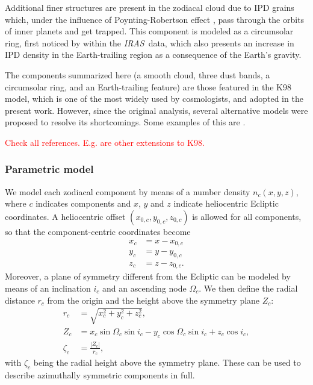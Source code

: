 \documentclass{aa}
\def\IRAS{\textit{{IRAS}}}
\newcommand{\angela}[0]{\textcolor{red}}
\begin{document}
Additional finer structures are present in the zodiacal cloud due to 
IPD grains which, under the influence of Poynting-Robertson effect \citep{Poynting1903,Robertson1937}, 
pass through the orbits of inner planets and get trapped. This component is modeled 
as a circumsolar ring, first noticed by \citet{Dermott1994} within the \IRAS\ data, 
which also presents an increase in IPD density in the Earth-trailing region as a consequence 
of the Earth's gravity.

The components summarized here (a smooth cloud, three dust bands, a circumsolar ring, and 
an Earth-trailing feature) are those featured in the K98 model, which is one of the most 
widely used by cosmologists, and adopted in the present work. However, since 
the original analysis, several alternative models were proposed to resolve its shortcomings. 
Some examples of this are \citet{sano, Korngut, skysurf, newhorizons, parker}.

\angela{Check all references. E.g. \citet{kennedy, jones_venus, Stenborg} are other 
extensions to K98.}

\subsubsection{Parametric model}
\label{sect:parametric_mod}

We model each zodiacal component by means of a number density $n_c(x,y,z)$, where $c$
indicates components and $x$, $y$ and $z$ indicate heliocentric Ecliptic coordinates. 
A heliocentric offset $(x_{0,c}, y_{0,c}, z_{0,c})$ is allowed for all components, 
so that the component-centric coordinates become
\begin{equation}    
    \begin{aligned}
        x_c&= x - x_{0,c}\\
        y_c&= y - y_{0,c}\\
        z_c&= z - z_{0,c}.
    \end{aligned}
\end{equation}
Moreover, a plane of symmetry different from the Ecliptic can be modeled by means 
of an inclination $i_c$ and an ascending node $\Omega_c$. We then define the
radial distance $r_c$ from the origin and the height above the symmetry plane $Z_c$:
\begin{align}
    r_c &= \sqrt{x_c^2 + y_c^2 + z_c^2},\\
    Z_c &= x_c\sin{\Omega_c}\sin{i_c} - y_c \cos{\Omega_c}\sin{i_c} + z_c \cos{i_c},\\
    \zeta_c &= \frac{|Z_c|}{r_c},
\end{align}
with $\zeta_c$ being the radial height above the symmetry plane. These can be used 
to describe azimuthally symmetric components in full.
\end{document}
